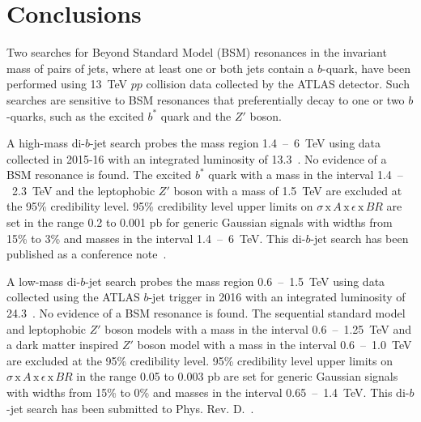 \chapter{Conclusions}
\label{sec:conc}

Two searches for Beyond Standard Model (BSM) resonances in the invariant mass of pairs of jets,
where at least one or both jets contain a $b$-quark,
have been performed using 13~TeV $pp$ collision data collected by the ATLAS detector.
Such searches are sensitive to BSM resonances that preferentially decay to one or two $b$-quarks, such as the excited $b^*$ quark and the $Z'$ boson.


A high-mass di-$b$-jet search probes the mass region 1.4~--~6~TeV
using data collected in 2015-16 with an integrated luminosity of 13.3~\ifb{}.
No evidence of a BSM resonance is found.
The excited $b^*$ quark with a mass in the interval 1.4~--~2.3~TeV
and the leptophobic $Z'$ boson with a mass of 1.5~TeV are excluded at the 95\% credibility level.
95\% credibility level upper limits on $\sigma\,\text{x}\,\mathit{A}\,\text{x}\,\epsilon\,\text{x}\,\mathit{BR}$
are set in the range 0.2 to 0.001 pb for generic Gaussian signals with widths from 15\% to 3\% and masses in the interval 1.4~--~6~TeV.
This di-$b$-jet search has been published as a conference note~\cite{dibjet-ichep_conf}.

A low-mass di-$b$-jet search probes the mass region 0.6~--~1.5~TeV
using data collected using the ATLAS $b$-jet trigger in 2016 with an integrated luminosity of 24.3~\ifb{}.
No evidence of a BSM resonance is found.
The sequential standard model and leptophobic $Z'$  boson models with a mass in the interval 0.6~--~1.25~TeV
and a dark matter inspired $Z'$ boson model with a mass in the interval 0.6~--~1.0~TeV are excluded at the 95\% credibility level.
95\% credibility level upper limits on $\sigma\,\text{x}\,\mathit{A}\,\text{x}\,\epsilon\,\text{x}\,\mathit{BR}$ in the range 0.05 to 0.003 pb
are set for generic Gaussian signals with widths from 15\% to 0\% and masses in the interval 0.65~--~1.4~TeV.
This di-$b$-jet search has been submitted to Phys. Rev. D.~\cite{dibjet-full}.


